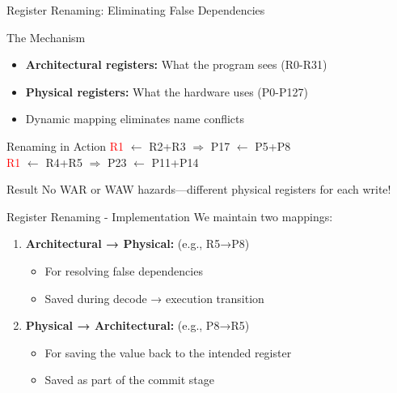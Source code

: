 \documentclass[aspectratio=169,12pt]{beamer}
\begin{document}
\begin{frame}{Register Renaming: Eliminating False Dependencies}
    \begin{block}{The Mechanism}
        \begin{itemize}
            \item \textbf{Architectural registers:} What the program sees (R0-R31)
            \item \textbf{Physical registers:} What the hardware uses (P0-P127)
            \item Dynamic mapping eliminates name conflicts
        \end{itemize}
    \end{block}
    
    \begin{exampleblock}{Renaming in Action}
        {\ttfamily\small
        \textcolor{red}{R1} $\leftarrow$ R2+R3  $\Rightarrow$  \textcolor{correctgreen}{P17} $\leftarrow$ P5+P8\\
        \textcolor{red}{R1} $\leftarrow$ R4+R5  $\Rightarrow$  \textcolor{correctgreen}{P23} $\leftarrow$ P11+P14
        }
    \end{exampleblock}
    
    \begin{alertblock}{Result}
        No WAR or WAW hazards—different physical registers for each write!
    \end{alertblock}
\end{frame}

\begin{frame}{Register Renaming - Implementation}
    We maintain two mappings:
    
    \begin{enumerate}
        \item \textbf{Architectural → Physical:} (e.g., R5→P8)
        \begin{itemize}
            \item For resolving false dependencies
            \item Saved during decode → execution transition
        \end{itemize}
        
        \item \textbf{Physical → Architectural:} (e.g., P8→R5)
        \begin{itemize}
            \item For saving the value back to the intended register
            \item Saved as part of the commit stage
        \end{itemize}
    \end{enumerate}
\end{frame}
\end{document}
